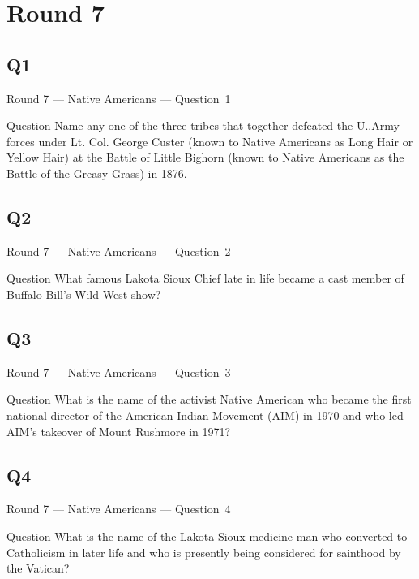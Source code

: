 \documentclass[11pt]{beamer}
\begin{document}
\section{Round 7}
\subsection*{Q1}
\begin{frame}[t]{Round 7 --- Native Americans --- \mbox{Question 1}}
    \vspace{-0.5em}
    \begin{block}{Question}
        Name any one of the three tribes that together defeated the U.\@S.\@ Army forces under Lt. Col. George Custer (known to Native Americans as Long Hair or Yellow Hair) at the Battle of Little Bighorn (known to Native Americans as the Battle of the Greasy Grass) in 1876.
    \end{block}
\end{frame}
\subsection*{Q2}
\begin{frame}[t]{Round 7 --- Native Americans --- \mbox{Question 2}}
    \vspace{-0.5em}
    \begin{block}{Question}
        What famous Lakota Sioux Chief late in life became a cast member of Buffalo Bill's Wild West show?
    \end{block}
\end{frame}
\subsection*{Q3}
\begin{frame}[t]{Round 7 --- Native Americans --- \mbox{Question 3}}
    \vspace{-0.5em}
    \begin{block}{Question}
        What is the name of the activist Native American who became the first national director of the American Indian Movement (AIM) in 1970 and who led AIM's takeover of Mount Rushmore in 1971?
    \end{block}
\end{frame}
\subsection*{Q4}
\begin{frame}[t]{Round 7 --- Native Americans --- \mbox{Question 4}}
    \vspace{-0.5em}
    \begin{block}{Question}
        What is the name of the Lakota Sioux medicine man who converted to Catholicism in later life and who is presently being considered for sainthood by the Vatican?
    \end{block}
\end{frame}
\end{document}
